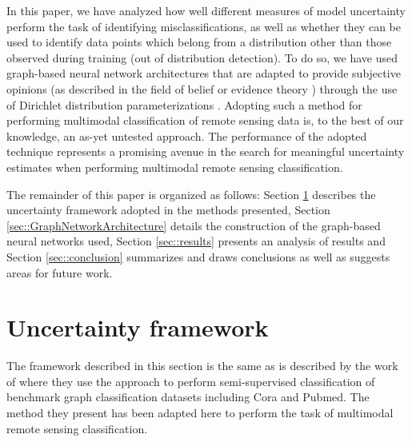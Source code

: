 \documentclass[
twocolumn,
]{ceurart}
\begin{document}
In this paper, we have analyzed how well different measures of model uncertainty perform the task of identifying misclassifications, as well as whether they can be used to identify data points which belong from a distribution other than those observed during training (out of distribution detection).
To do so, we have used graph-based neural network architectures that are adapted to provide subjective opinions (as described in the field of belief or evidence theory \cite{Josang2018}) through the use of Dirichlet distribution parameterizations \cite{Kipf2017, ZhaoXujiang2020}.
Adopting such a method for performing multimodal classification of remote sensing data is, to the best of our knowledge, an as-yet untested approach.
The performance of the adopted technique represents a promising avenue in the search for meaningful uncertainty estimates when performing multimodal remote sensing classification.

The remainder of this paper is organized as follows: Section \ref{sec::unc_framework} describes the uncertainty framework adopted in the methods presented, Section \ref{sec::GraphNetworkArchitecture} details the construction of the graph-based neural networks used, Section \ref{sec::results} presents an analysis of results and Section \ref{sec::conclusion} summarizes and draws conclusions as well as suggests areas for future work.

\section{Uncertainty framework}
\label{sec::unc_framework}

The framework described in this section is the same as is described by the work of \cite{ZhaoXujiang2020} where they use the approach to perform semi-supervised classification of benchmark graph classification datasets including Cora and Pubmed.
The method they present has been adapted here to perform the task of multimodal remote sensing classification.
\end{document}
